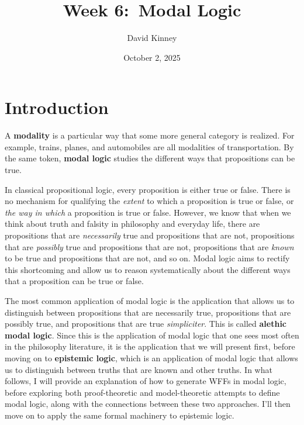 \documentclass[11pt]{article}
\title{Week 6:\ Modal Logic}
\author{David Kinney}
\date{October 2, 2025}
\theoremstyle{definition}
\theoremstyle{remark}
\begin{document}
\maketitle

\section{Introduction}
A \textbf{modality} is a particular way that some more general category is realized. For example, trains, planes, and automobiles are all modalities of transportation. By the same token, \textbf{modal logic} studies the different ways that propositions can be true.\par 

In classical propositional logic, every proposition is either true or false. There is no mechanism for qualifying the \textit{extent} to which a proposition is true or false, or \textit{the way in which} a proposition is true or false.  However, we know that when we think about truth and falsity in philosophy and everyday life, there are propositions that are \textit{necessarily} true and propositions that are not, propositions that are \textit{possibly} true and propositions that are not, propositions that are \textit{known} to be true and propositions that are not, and so on. Modal logic aims to rectify this shortcoming and allow us to reason systematically about the different ways that a proposition can be true or false.\par

The most common application of modal logic is the application that allows us to distinguish between propositions that are necessarily true, propositions that are possibly true, and propositions that are true \textit{simpliciter}. This is called \textbf{alethic modal logic}. Since this is the application of modal logic that one sees most often in the philosophy literature, it is the application that we will present first, before moving on to \textbf{epistemic logic}, which is an application of modal logic that allows us to distinguish between truths that are known and other truths. In what follows, I will provide an explanation of how to generate WFFs in modal logic, before exploring both proof-theoretic and model-theoretic attempts to define modal logic, along with the connections between these two approaches. I'll then move on to apply the same formal machinery to epistemic logic.\par
\end{document}
